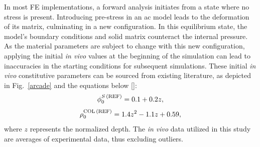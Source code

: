 In most FE implementations, a forward analysis initiates from a state where no stress is present. Introducing pre-stress in an \ac{ac} model leads to the deformation of its matrix, culminating in a new configuration. In this equilibrium state, the model's boundary conditions and solid matrix counteract the internal pressure. As the material parameters are subject to change with this new configuration, applying the initial \textit{in vivo} values at the beginning of the simulation can lead to inaccuracies in the starting conditions for subsequent simulations. These initial \textit{in vivo} constitutive parameters can be sourced from existing literature, as depicted in Fig.~\ref{arcade} and the equations below [\cite{wilson2007,rieppo2004,shapiro2001,lipshitz1975}]:
%
\begin{equation}
\phi_0^{S \, \rm{(REF)}}=0.1+0.2z,
\end{equation}
%
\begin{equation}
\rho_0^{\text{COL} \, (\rm{REF})}  =1.4z^2-1.1z+0.59,
\end{equation}
%
where $z$ represents the normalized depth. The \textit{in vivo} data utilized in this study are averages of experimental data, thus excluding outliers.

